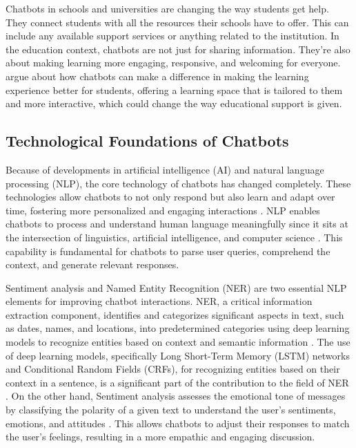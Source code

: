 \documentclass{l4proj}
\begin{document}
Chatbots in schools and universities are changing the way students get help. They connect students with all the resources their schools have to offer. This can include any available support services or anything related to the institution.  In the education context, chatbots are not just for sharing information. They're also about making learning more engaging, responsive, and welcoming for everyone. \cite{WinklerSollner2018} argue about how chatbots can make a difference in making the learning experience better for students, offering a learning space that is tailored to them and more interactive, which could change the way educational support is given.

\subsection{ Technological Foundations of Chatbots}


Because of developments in artificial intelligence (AI) and natural language processing (NLP), the core technology of chatbots has changed completely. These technologies allow chatbots to not only respond but also learn and adapt over time, fostering more personalized and engaging
interactions \citep{alamin2024history}. NLP enables chatbots to process and understand human language meaningfully since it sits at the intersection of linguistics, artificial intelligence, and computer science \citep{abdulla2022chatbots}. This capability is fundamental for chatbots to parse user queries, comprehend the context, and generate relevant responses.

Sentiment analysis and Named Entity Recognition (NER) are two essential NLP elements for improving chatbot interactions. NER, a critical information extraction component, identifies and categorizes significant aspects in text, such as dates, names, and locations, into predetermined categories using deep learning models to recognize entities based on context and semantic information \citep{Nerpredetermined}. The use of deep learning models, specifically Long Short-Term Memory (LSTM) networks and Conditional Random Fields (CRFs), for recognizing entities based on their context in a sentence, is a significant part of the contribution to the field of NER \citep{ner}. On the other hand, Sentiment analysis assesses the emotional tone of messages by classifying the polarity of a given text to understand the user's sentiments, emotions, and attitudes \citep{sentiment}. This allows chatbots to adjust their responses to match the user's feelings, resulting in a more empathic and engaging discussion.
\end{document}
